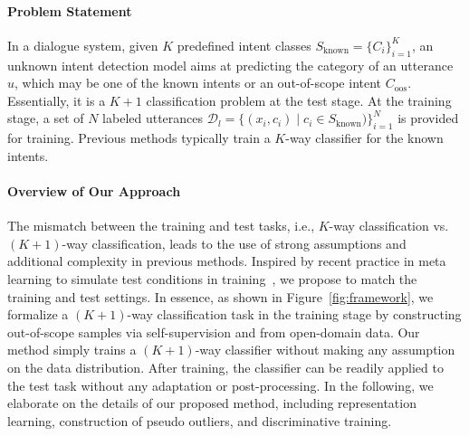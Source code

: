 

\paragraph{Problem Statement}
In a dialogue system, given $K$ predefined intent classes $S_{\text{known}}=\{C_i\}_{i=1}^K$, an unknown intent detection model aims at predicting the category of an utterance $u$, which may be one of the known intents or an out-of-scope intent $C_{\text{oos}}$. Essentially, it is a $K+1$ classification problem at the test stage. At the training stage, a set of $N$ labeled utterances $\mathcal{D}_{l} = \{ (x_i,c_i) \mid c_i\in S_{\text{known}})\}_{i=1}^{N}$ is provided for training. Previous methods typically train a $K$-way classifier for the known intents. %


\paragraph{Overview of Our Approach} 
The mismatch between the training and test tasks, i.e., $K$-way classification vs. $(K+1)$-way classification, leads to the use of strong assumptions and additional complexity in previous methods. Inspired by recent practice in meta learning to simulate test conditions in training~\citep{vinyals2016matching}, we propose to match the training and test settings. In essence, as shown in Figure~\ref{fig:framework}, we formalize a $(K+1)$-way classification task in the training stage by constructing out-of-scope samples via self-supervision and from open-domain data. Our method simply trains a $(K+1)$-way classifier without making any assumption on the data distribution. After training, the classifier can be readily applied to the test task without any adaptation or post-processing.
In the following, we elaborate on the details of our proposed method, including representation learning, construction of pseudo outliers, and discriminative training.

